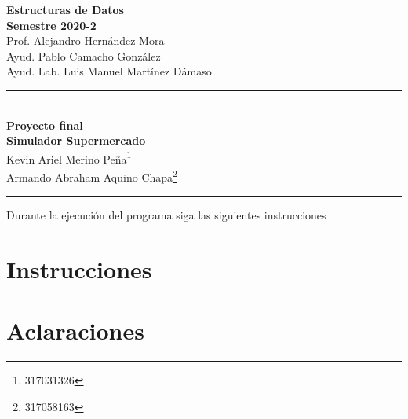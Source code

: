 \documentclass[letterpaper,11pt]{article}
\begin{document}
\begin{center}
\vspace{-114pt}
\textbf{\large Estructuras de Datos}\\
\textbf{ Semestre 2020-2}\\
Prof. Alejandro Hernández Mora\\
Ayud. Pablo Camacho González  \\ 
Ayud. Lab. Luis Manuel Martínez Dámaso   \\
\rule{17cm}{0.3mm}\\
\textbf{Proyecto final}\\
\huge\textbf{Simulador Supermercado}\\[0.1cm]
\normalsize Kevin Ariel Merino Peña\footnote{317031326}\\
Armando Abraham Aquino Chapa\footnote{317058163}\\
\rule{17cm}{0.3mm}
\end{center}
\begin{flushright}
\vspace{-3pt}
\end{flushright}

\noindent Durante la ejecución del programa siga las siguientes instrucciones

\section*{Instrucciones}


\section*{Aclaraciones}
\end{document}
